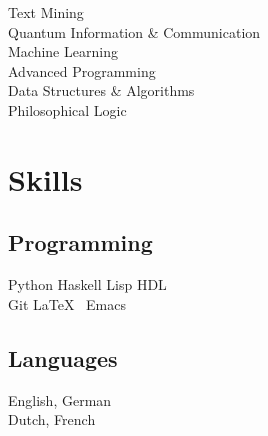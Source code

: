 \documentclass[letterpaper]{deedy-resume} %
\begin{document}
\begin{minipage}[t]{0.33\textwidth}
Text Mining \\
Quantum Information \& Communication\\
Machine Learning\\
Advanced Programming\\
Data Structures & Algorithms \\

Philosophical Logic\\

\sectionspace %


\section{Skills}

\subsection{Programming}

Python \textbullet{} Haskell \textbullet{} Lisp\textbullet{} HDL\textbullet{} %
\\
Git \textbullet{}\LaTeX\ \textbullet{} Emacs
\sectionspace %

\subsection{Languages}
English, German
\\
Dutch, French

\end{minipage} %
\hfill
%
%
\end{document}
